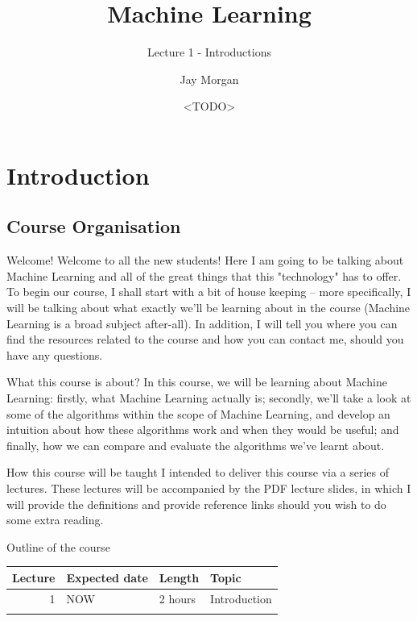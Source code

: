 \documentclass[10pt]{beamer}
\author{Jay Morgan}
\date{<TODO>}
\title{Machine Learning}
\subtitle{Lecture 1 - Introductions}
\begin{document}
\maketitle

\section*{Introduction}
\label{sec:org494addd}

\subsection*{Course Organisation}
\label{sec:orge238814}

\begin{frame}[label={sec:org4ae1d45}]{Welcome!}
Welcome to all the new students! Here I am going to be talking about Machine Learning
and all of the great things that this "technology" has to offer. To begin our course,
I shall start with a bit of house keeping -- more specifically, I will be talking
about what exactly we'll be learning about in the course (Machine Learning is a broad
subject after-all). In addition, I will tell you where you can find the resources
related to the course and how you can contact me, should you have any questions.
\end{frame}

\begin{frame}[label={sec:org4bea451}]{What this course is about?}
In this course, we will be learning about Machine Learning: firstly, what Machine
Learning actually is; secondly, we'll take a look at some of the algorithms within
the scope of Machine Learning, and develop an intuition about how these algorithms
work and when they would be useful; and finally, how we can compare and evaluate the
algorithms we've learnt about.
\end{frame}

\begin{frame}[label={sec:orga2ff1e0}]{How this course will be taught}
I intended to deliver this course via a series of lectures. These lectures will be
accompanied by the PDF lecture slides, in which I will provide the definitions and
provide reference links should you wish to do some extra reading.
\end{frame}

\begin{frame}[label={sec:orgc391f61}]{Outline of the course}
\begin{center}
\begin{tabular}{rlll}
\toprule
Lecture & Expected date & Length & Topic\\
\midrule
1 & NOW & 2 hours & Introduction\\
 &  &  & \\
\bottomrule
\end{tabular}
\end{center}
\end{frame}
\end{document}
